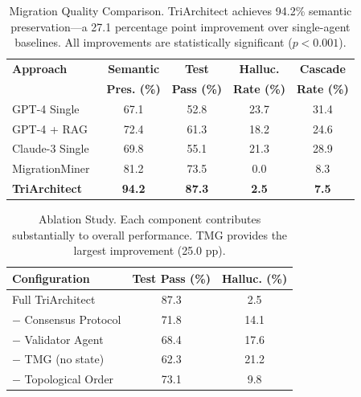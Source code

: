 \begin{table}[t]
\centering
\caption{Migration Quality Comparison. TriArchitect achieves 94.2\% semantic preservation—a 27.1 percentage point improvement over single-agent baselines. All improvements are statistically significant ($p < 0.001$).}
\label{tab:results}
\begin{tabular}{@{}lcccc@{}}
\toprule
\textbf{Approach} & \textbf{Semantic} & \textbf{Test} & \textbf{Halluc.} & \textbf{Cascade} \\
                  & \textbf{Pres. (\%)} & \textbf{Pass (\%)} & \textbf{Rate (\%)} & \textbf{Rate (\%)} \\
\midrule
GPT-4 Single          & 67.1 & 52.8 & 23.7 & 31.4 \\
GPT-4 + RAG           & 72.4 & 61.3 & 18.2 & 24.6 \\
Claude-3 Single       & 69.8 & 55.1 & 21.3 & 28.9 \\
MigrationMiner~\cite{alrubaye2019} & 81.2 & 73.5 & 0.0 & 8.3 \\
\midrule
\textbf{TriArchitect} & \textbf{94.2} & \textbf{87.3} & \textbf{2.5} & \textbf{7.5} \\
\bottomrule
\end{tabular}
\end{table}



\begin{table}[t]
\centering
\caption{Ablation Study. Each component contributes substantially to overall performance. TMG provides the largest improvement (25.0 pp).}
\label{tab:ablation}
\begin{tabular}{@{}lcc@{}}
\toprule
\textbf{Configuration} & \textbf{Test Pass (\%)} & \textbf{Halluc. (\%)} \\
\midrule
Full TriArchitect              & 87.3 & 2.5 \\
\quad $-$ Consensus Protocol   & 71.8 & 14.1 \\
\quad $-$ Validator Agent      & 68.4 & 17.6 \\
\quad $-$ TMG (no state)       & 62.3 & 21.2 \\
\quad $-$ Topological Order    & 73.1 & 9.8 \\
\bottomrule
\end{tabular}
\end{table}


